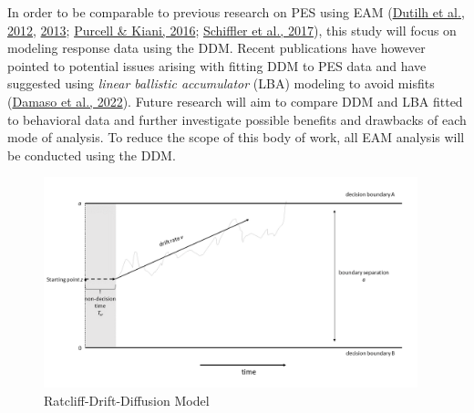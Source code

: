 \documentclass[
  man,floatsintext]{apa7}
\begin{document}
In order to be comparable to previous research on PES using EAM (\protect\hyperlink{ref-dutilh2012testing}{Dutilh et al., 2012}, \protect\hyperlink{ref-dutilh2013}{2013}; \protect\hyperlink{ref-purcell2016}{Purcell \& Kiani, 2016}; \protect\hyperlink{ref-schiffler2017}{Schiffler et al., 2017}), this study will focus on modeling response data using the DDM. Recent publications have however pointed to potential issues arising with fitting DDM to PES data and have suggested using \emph{linear ballistic accumulator} (LBA) modeling to avoid misfits (\protect\hyperlink{ref-damaso2022}{Damaso et al., 2022}). Future research will aim to compare DDM and LBA fitted to behavioral data and further investigate possible benefits and drawbacks of each mode of analysis. To reduce the scope of this body of work, all EAM analysis will be conducted using the DDM.



\begin{figure}
\includegraphics[width=4.27in]{images/ddm-slide/Slide1} \caption{Ratcliff-Drift-Diffusion Model}\label{fig:ddm-slide}
\end{figure}
\end{document}

